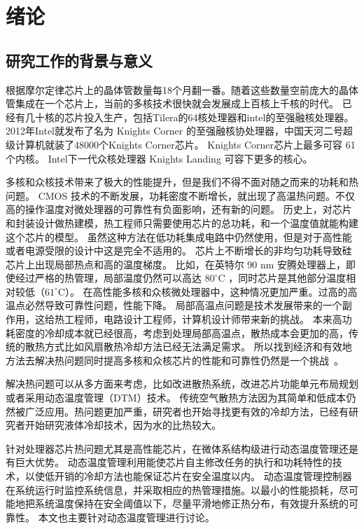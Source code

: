 
\chapter{绪论}
\section{研究工作的背景与意义}\label{sec:mean}
根据摩尔定律芯片上的晶体管数量每18个月翻一番。随着这些数量空前庞大的晶体管集成在一个芯片上，当前的多核技术很快就会发展成上百核上千核的时代。
已经有几十核的芯片投入生产，包括Tilera的64核处理器和intel的至强融核处理器。2012年Intel就发布了名为 Knights Corner 的至强融核协处理器，中国天河二号超级计算机就装了48000个Knights Corner芯片。
Knights Corner芯片上最多可容 61个内核。
Intel下一代众核处理器 Knights Landing 可容下更多的核心。


多核和众核技术带来了极大的性能提升，但是我们不得不面对随之而来的功耗和热问题。
CMOS 技术的不断发展，功耗密度不断增长，就出现了高温热问题。不仅高的操作温度对微处理器的可靠性有负面影响，还有新的问题。
历史上，对芯片和封装设计做热建模，热工程师只需要使用芯片的总功耗，和一个温度值就能构建这个芯片的模型。
虽然这种方法在低功耗集成电路中仍然使用，但是对于高性能或者电源受限的设计中这是完全不适用的。
芯片上不断增长的非均匀功耗导致硅芯片上出现局部热点和高的温度梯度。
比如，在英特尔 90 nm 安腾处理器上，即使经过严格的热管理，局部温度仍然可以高达 $80 ^\circ$C ，同时芯片是其他部分温度相对较低（$61^\circ$C）。
在高性能多核和众核微处理器中，这种情况更加严重。过高的高温点必然导致可靠性问题，性能下降。
局部高温点问题是技术发展带来的一个副作用，这给热工程师，电路设计工程师，计算机设计师带来新的挑战。
本来高功耗密度的冷却成本就已经很高，考虑到处理局部高温点，散热成本会更加的高，传统的散热方式比如风扇散热冷却方法已经无法满足需求。
所以找到经济和有效地方法去解决热问题同时提高多核和众核芯片的性能和可靠性仍然是一个挑战~。


解决热问题可以从多方面来考虑，比如改进散热系统，改进芯片功能单元布局规划或者采用动态温度管理（DTM）技术。
传统空气散热方法因为其简单和低成本仍然被广泛应用。热问题更加严重，研究者也开始寻找更有效的冷却方法，已经有研究者开始研究液体冷却技术，因为水的比热较大。

针对处理器芯片热问题尤其是高性能芯片，在微体系结构级进行动态温度管理还是有巨大优势。
动态温度管理利用能使芯片自主修改任务的执行和功耗特性的技术，以使低开销的冷却方法也能保证芯片在安全温度以内。
动态温度管理控制器在系统运行时监控系统信息，并采取相应的热管理措施。以最小的性能损耗，尽可能地把系统温度保持在安全阈值以下，尽量平滑地修正热分布，有效提升系统的可靠性。
本文也主要针对动态温度管理进行讨论。



